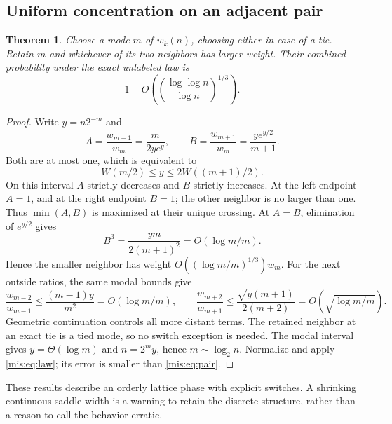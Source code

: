 \documentclass[11pt]{article}
\newtheorem{theorem}{Theorem}[section]
\theoremstyle{remark}\newtheorem{remark}[theorem]{Remark}
\begin{document}
\subsection{Uniform concentration on an adjacent pair}
\begin{theorem}\label{mis:thm:pair}
Choose a mode $m$ of $w_k(n)$, choosing either in case of a tie. Retain $m$ and whichever of its two neighbors has larger weight. Their combined probability under the exact unlabeled law is
\begin{equation}\label{mis:eq:pair}
 1-O\left(\left(\frac{\log\log n}{\log n}\right)^{1/3}\right).
\end{equation}
\end{theorem}
\begin{proof}
Write $y=n2^{-m}$ and
\[
 A=\frac{w_{m-1}}{w_m}=\frac{m}{2ye^y},\qquad
 B=\frac{w_{m+1}}{w_m}=\frac{ye^{y/2}}{m+1}.
\]
Both are at most one, which is equivalent to
\[
 W(m/2)\le y\le2W((m+1)/2).
\]
On this interval $A$ strictly decreases and $B$ strictly increases. At the left endpoint $A=1$, and at the right endpoint $B=1$; the other neighbor is no larger than one. Thus $\min(A,B)$ is maximized at their unique crossing. At $A=B$, elimination of $e^{y/2}$ gives
\[
 B^3=\frac{ym}{2(m+1)^2}=O(\log m/m).
\]
Hence the smaller neighbor has weight $O((\log m/m)^{1/3})w_m$. For the next outside ratios, the same modal bounds give
\[
 \frac{w_{m-2}}{w_{m-1}}\le\frac{(m-1)y}{m^2}=O(\log m/m),\qquad
 \frac{w_{m+2}}{w_{m+1}}\le\frac{\sqrt{y(m+1)}}{2(m+2)}
                       =O\left(\sqrt{\log m/m}\right).
\]
Geometric continuation controls all more distant terms. The retained neighbor at an exact tie is a tied mode, so no switch exception is needed. The modal interval gives $y=\Theta(\log m)$ and $n=2^m y$, hence $m\sim\log_2 n$. Normalize and apply \eqref{mis:eq:law}; its error is smaller than \eqref{mis:eq:pair}.
\end{proof}
These results describe an orderly lattice phase with explicit switches. A shrinking continuous saddle width is a warning to retain the discrete structure, rather than a reason to call the behavior erratic.
\end{document}
